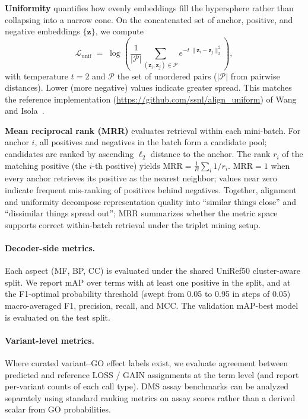 \documentclass[11pt,a4paper]{article}
\begin{document}
\textbf{Uniformity} quantifies how evenly embeddings fill the hypersphere rather than collapsing into a narrow cone. On the concatenated set of anchor, positive, and negative embeddings $\{\mathbf{z}\}$, we compute
\[
\mathcal{L}_{\text{unif}} \;=\; \log\!\left(\frac{1}{|\mathcal{P}|}\sum_{(\mathbf{z}_i,\mathbf{z}_j)\in\mathcal{P}} e^{-t\,\|\mathbf{z}_i-\mathbf{z}_j\|_2^2}\right),
\]
with temperature $t{=}2$ and $\mathcal{P}$ the set of unordered pairs ($|\mathcal{P}|$ from pairwise distances). Lower (more negative) values indicate greater spread. This matches the reference implementation (\url{https://github.com/ssnl/align_uniform}) of Wang and Isola~\cite{wang2020hypersphere}.

\textbf{Mean reciprocal rank (MRR)} evaluates retrieval within each mini-batch. For anchor $i$, all positives and negatives in the batch form a candidate pool; candidates are ranked by ascending $\ell_2$ distance to the anchor. The rank $r_i$ of the matching positive (the $i$-th positive) yields $\mathrm{MRR}=\frac{1}{B}\sum_i 1/r_i$. MRR${=}1$ when every anchor retrieves its positive as the nearest neighbor; values near zero indicate frequent mis-ranking of positives behind negatives. Together, alignment and uniformity decompose representation quality into ``similar things close'' and ``dissimilar things spread out''; MRR summarizes whether the metric space supports correct within-batch retrieval under the triplet mining setup.

\paragraph{Decoder-side metrics.}
Each aspect (MF, BP, CC) is evaluated under the shared UniRef50 cluster-aware split. We report mAP over terms with at least one positive in the split, and at the F1-optimal probability threshold (swept from 0.05 to 0.95 in steps of 0.05) macro-averaged F1, precision, recall, and MCC. The validation mAP-best model is evaluated on the test split.

\paragraph{Variant-level metrics.}
Where curated variant--GO effect labels exist, we evaluate agreement between predicted and reference LOSS / GAIN assignments at the term level (and report per-variant counts of each call type). DMS assay benchmarks can be analyzed separately using standard ranking metrics on assay scores rather than a derived scalar from GO probabilities.
\end{document}
